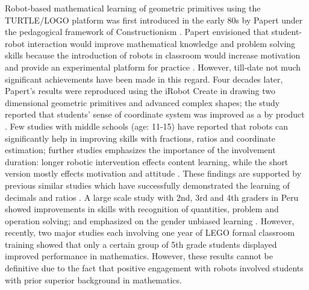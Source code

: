 \documentclass[conference]{IEEEtran}
\begin{document}
Robot-based mathematical learning of geometric primitives using the TURTLE/LOGO platform was first introduced in the 
early 80s by Papert under the pedagogical framework of Constructionism \cite{papert1980mindstorms}. Papert envisioned 
that student-robot interaction would improve mathematical knowledge and problem solving skills because the introduction 
of robots in classroom would increase motivation and provide an experimental platform for practice 
\cite{portsmore2004bringing, ruiz2004robotics, robinson2005robotics}. However, till-date not much significant 
achievements have been made in this regard. Four decades later, Papert's results were reproduced using the 
iRobot Create in drawing two dimensional geometric primitives and advanced complex shapes; the study reported that 
students' sense of coordinate system was improved as a by product \cite{walker2012user}. Few studies with 
middle schools (age: 11-15) \cite{nugent2008effect, nugent2009use} have reported that robots can significantly help 
in improving skills with fractions, ratios and coordinate estimation; further studies emphasizes the importance of 
the involvement duration: longer robotic intervention effects content learning, while the short version mostly 
effects motivation and attitude \cite{nugent2010impact}. These findings are supported by previous similar studies which 
have successfully demonstrated the learning of decimals \cite{portsmore2004bringing} and ratios \cite{norton2004using, 
barker2007robotics}. A large scale study with 2nd, 3rd and 4th graders in Peru showed improvements in skills with 
recognition of quantities, problem and operation solving; and emphasized on the gender unbiased learning 
\cite{iturrizaga2000study}. However, recently, two major studies \cite{hussain2006effect, lindh2007does} each involving 
one year of LEGO formal classroom training showed that only a certain group of 5th grade students displayed improved 
performance in mathematics. However, these results cannot be definitive due to the fact that positive engagement with 
robots involved students with prior superior background in mathematics.
\end{document}
